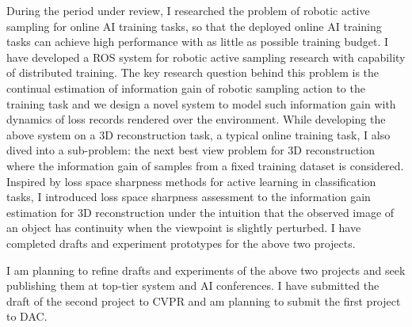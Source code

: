 During the period under review, I researched the problem of robotic active sampling for online AI training tasks, so that the deployed online AI training tasks can achieve high performance with as little as possible training budget. I have developed a ROS system for robotic active sampling research with capability of distributed training. The key research question behind this problem is the continual estimation of information gain of robotic sampling action to the training task and we design a novel system to model such information gain with dynamics of loss records rendered over the environment.
While developing the above system on a 3D reconstruction task, a typical online training task, I also dived into a sub-problem: the next best view problem for 3D reconstruction where the information gain of samples from a fixed training dataset is considered. Inspired by loss space sharpness methods for active learning in classification tasks, I introduced loss space sharpness assessment to the information gain estimation for 3D reconstruction under the intuition that the observed image of an object has continuity when the viewpoint is slightly perturbed.
I have completed drafts and experiment prototypes for the above two projects.

I am planning to refine drafts and experiments of the above two projects and seek publishing them at top-tier system and AI conferences. I have submitted the draft of the second project to CVPR and am planning to submit the first project to DAC.